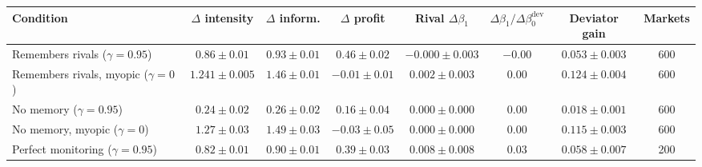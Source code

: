 \begin{tabular}{lccccccc}
\toprule
Condition & $\Delta$ intensity & $\Delta$ inform. & $\Delta$ profit & Rival $\Delta\beta_1$ & $\Delta\beta_1/\Delta\beta^{\mathrm{dev}}_0$ & Deviator gain & Markets \\
\midrule
Remembers rivals ($\gamma=0.95$) & $0.86 \pm 0.01$ & $0.93 \pm 0.01$ & $0.46 \pm 0.02$ & $-0.000 \pm 0.003$ & $-0.00$ & $0.053 \pm 0.003$ & 600 \\
Remembers rivals, myopic ($\gamma=0$) & $1.241 \pm 0.005$ & $1.46 \pm 0.01$ & $-0.01 \pm 0.01$ & $0.002 \pm 0.003$ & $0.00$ & $0.124 \pm 0.004$ & 600 \\
No memory ($\gamma=0.95$) & $0.24 \pm 0.02$ & $0.26 \pm 0.02$ & $0.16 \pm 0.04$ & $0.000 \pm 0.000$ & $0.00$ & $0.018 \pm 0.001$ & 600 \\
No memory, myopic ($\gamma=0$) & $1.27 \pm 0.03$ & $1.49 \pm 0.03$ & $-0.03 \pm 0.05$ & $0.000 \pm 0.000$ & $0.00$ & $0.115 \pm 0.003$ & 600 \\
Perfect monitoring ($\gamma=0.95$) & $0.82 \pm 0.01$ & $0.90 \pm 0.01$ & $0.39 \pm 0.03$ & $0.008 \pm 0.008$ & $0.03$ & $0.058 \pm 0.007$ & 200 \\
\bottomrule
\end{tabular}
